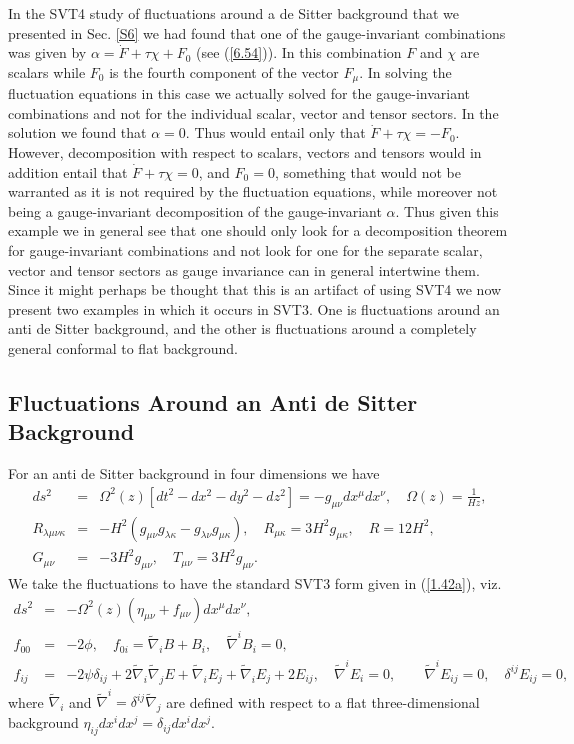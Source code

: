 \documentclass[aps,onecolumn,10pt]{revtex4}
\numberwithin{equation}{section}
\numberwithin{equation}{section}
\begin{document}
In the SVT4 study of fluctuations around a de Sitter background that we presented in Sec. \ref{S6} we had found that one of the gauge-invariant combinations was given by $\alpha=\dot{F}+\tau \chi +F_0$ (see (\ref{6.54})). In this combination $F$ and $\chi$ are scalars while $F_0$ is the fourth component of the vector $F_{\mu}$. In solving the fluctuation equations in this case we actually solved for the gauge-invariant combinations and not for the individual scalar, vector and tensor sectors. In the solution we found that $\alpha=0$.  Thus would entail only that  $\dot{F}+\tau \chi =-F_0$. However, decomposition with respect to scalars, vectors and tensors would in addition entail that $\dot{F}+\tau \chi=0$, and $F_0=0$, something that would not be warranted as it is not required by the fluctuation equations, while moreover not being a gauge-invariant decomposition of the 
gauge-invariant $\alpha$. Thus given this example we in general see that one should only look for a decomposition theorem for gauge-invariant combinations and not look for one for the separate scalar, vector and tensor sectors as gauge invariance can in general intertwine them. Since it might perhaps be thought that this is an artifact of using SVT4 we now present two examples in which it occurs in SVT3. One is fluctuations around an anti de Sitter background, and the other is fluctuations around a completely general conformal to flat background.

\subsection{Fluctuations Around an Anti de Sitter Background}
\label{S14a}
For an anti de Sitter background in four dimensions we have
%
\begin{eqnarray}
ds^2 &=& \Omega^2(z)\left[ dt^2 - dx^2-dy^2-dz^2\right]= -g_{\mu\nu}dx^{\mu} dx^{\nu},\quad
\Omega(z) = \frac{1}{Hz},
\nonumber\\
R_{\lambda\mu\nu\kappa} &=& -H^2(g_{\mu\nu}g_{\lambda\kappa} -g_{\lambda\nu}g_{\mu\kappa}),
\quad R_{\mu\kappa} =3H^2 g_{\mu\kappa},\quad R = 12H^2,
\nonumber\\
G_{\mu\nu} &=& -3H^2 g_{\mu\nu},\quad T_{\mu\nu} = 3H^2 g_{\mu\nu}.
\label{14.1}
\end{eqnarray}
%
We take the fluctuations to have the standard SVT3 form given in (\ref{1.42a}), viz. 
%
\begin{eqnarray}
ds^2 &=&- \Omega^2(z)\left( \eta_{\mu\nu}+ f_{\mu\nu}\right) dx^\mu dx^\nu,
\nonumber\\
f_{00} &=& -2 \phi,\quad f_{0i} = \tilde\nabla_i B + B_i,\quad \tilde{\nabla}^iB_i=0,
\nonumber\\
f_{ij} &=& -2 \psi \delta_{ij} + 2\tilde\nabla_i\tilde\nabla_j E + \tilde\nabla_i E_j
+ \tilde\nabla_i E_j + 2E_{ij},\quad \tilde{\nabla}^iE_i=0,\qquad \tilde{\nabla}^iE_{ij}=0,\quad \delta^{ij}E_{ij}=0, 
\label{14.2}
\end{eqnarray}
%
where $\tilde{\nabla}_i$ and $\tilde{\nabla}^i=\delta^{ij}\tilde{\nabla}_j$ are defined with respect to a flat three-dimensional background $\eta_{ij}dx^idx^j=\delta_{ij}dx^idx^j$.
\end{document}
